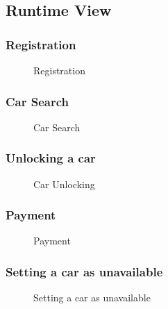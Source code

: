 \documentclass[english]{article}
\begin{document}
\newpage
\subsection{Runtime View}

\subsubsection{Registration}
\begin{figure}[H]
	\centering
	\makebox[\textwidth][c]{
		\def\svgwidth{450pt}
		
	}
	\caption{Registration}
	\label{seq_registration}
\end{figure}

\subsubsection{Car Search}
\begin{figure}[H]
	\centering
	\makebox[\textwidth][c]{
		\def\svgwidth{450pt}
		
	}
	\caption{Car Search}
	\label{seq_carsearch}
\end{figure}

\subsubsection{Unlocking a car}
\begin{figure}[H]
	\centering
	\makebox[\textwidth][c]{
		\def\svgwidth{450pt}
		
	}
	\caption{Car Unlocking}
	\label{seq_carunlock}
\end{figure}

\subsubsection{Payment}
\begin{figure}[H]
	\centering
	\makebox[\textwidth][c]{
		\def\svgwidth{450pt}
		
	}
	\caption{Payment}
	\label{seq_payment}
\end{figure}

\subsubsection{Setting a car as unavailable}
\begin{figure}[H]
	\centering
	\makebox[\textwidth][c]{
		\def\svgwidth{450pt}
		
	}
	\caption{Setting a car as unavailable}
	\label{seq_carunavailable}
\end{figure}
\end{document}
